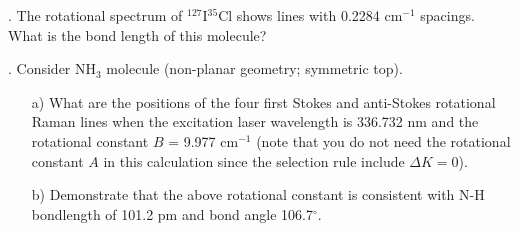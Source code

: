 
. The rotational spectrum of $^{127}$I$^{35}$Cl shows lines with 0.2284 cm$^{-1}$ spacings. What is the bond length of this molecule?\\


. Consider NH$_3$ molecule (non-planar geometry; symmetric top).

\begin{itemize}
\item[a)] What are the positions of the four first Stokes and anti-Stokes rotational Raman lines when the excitation laser wavelength is 336.732 nm and the rotational constant $B$ = 9.977 cm$^{-1}$ (note that you do not need the rotational constant $A$ in this calculation since the selection rule include $\Delta K = 0$).

\item[b)] Demonstrate that the above rotational constant is consistent with N-H bondlength of 101.2 pm and bond angle 106.7$^\circ$. 

\end{itemize}




